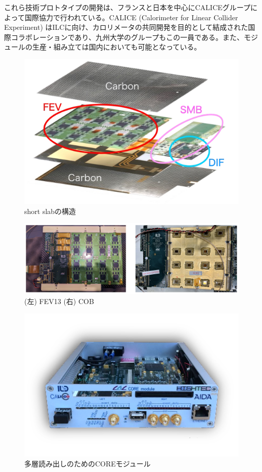 これら技術プロトタイプの開発は、フランスと日本を中心にCALICEグループによって国際協力で行われている。CALICE (Calorimeter for Linear Collider Experiment) はILCに向け、カロリメータの共同開発を目的として結成された国際コラボレーションであり、九州大学のグループもこの一員である。また、モジュールの生産・組み立ては国内においても可能となっている。
\begin{figure}[h]
	\begin{center}
	\includegraphics[keepaspectratio, scale=0.7]
 	{Figure/Siwecal/shortslab.png}
 		\caption{short slabの構造}
 		\label{shortslab}
	\end{center}
 \end{figure}
 \begin{figure}[ht]
	\begin{center}
	\includegraphics[keepaspectratio, scale=0.3]
 	{Figure/Siwecal/fevcob.png}
 		\caption[FEV13, COB]{(左) FEV13 (右) COB}
 		\label{fevcob}
	\end{center}
 \end{figure}
 \begin{figure}[ht]
	\begin{center}
	\includegraphics[keepaspectratio, scale=0.7]
 	{Figure/Siwecal/core.png}
 		\caption{多層読み出しのためのCOREモジュール}
 		\label{core}
	\end{center}
 \end{figure}